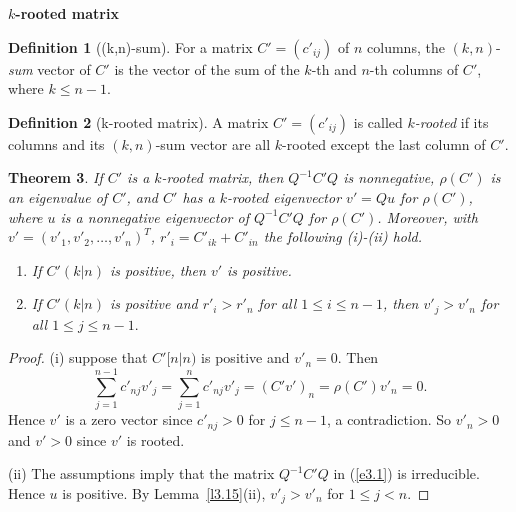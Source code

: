 \documentclass{beamer}
\theoremstyle{plain}
\newtheorem{thm}{Theorem}[section]
\theoremstyle{definition}
\newtheorem{defn}[thm]{Definition}
\begin{document}
\begin{frame}{\bf $k$-rooted matrix}

\begin{defn}[(k,n)-sum]
For a matrix $C'=(c'_{ij})$ of $n$ columns, the $(k, n)$-{\it sum} vector of $C'$ is the vector of the sum of the $k$-th and  $n$-th columns of $C'$, where $k\leq n-1$.
\end{defn}

\begin{defn}[k-rooted matrix]
A  matrix $C'=(c'_{ij})$ is called {\it $k$-rooted}  if its  columns and its $(k, n)$-sum vector are all $k$-rooted except the last column of $C'$.
\end{defn}

\end{frame}

\begin{frame}

\begin{thm}
If $C'$ is a $k$-rooted matrix, then $Q^{-1}C'Q$ is nonnegative, $\rho(C')$ is an eigenvalue of $C'$,
and $C'$ has a $k$-rooted eigenvector $v'=Qu$ for $\rho(C')$,
where $u$ is a nonnegative eigenvector of $Q^{-1}C'Q$ for $\rho(C')$.
    Moreover, with $v'=(v'_1, v'_2, \ldots, v'_n)^T$, $r'_{i} = C'_{ik} + C'_{in}$
    the following (i)-(ii) hold.
\begin{enumerate}
    \item[(i)] If $C' (k|n)$ is positive, then $v'$ is positive.
    \item[(ii)] If  $C' (k|n)$ is positive and  $r'_i> r'_n$ for all $1\leq i\leq n-1$, then $v'_j>v'_n$ for all $1\leq j\leq n-1.$
\end{enumerate}

\end{thm}

\end{frame}

\begin{frame}

\begin{proof}
(i) suppose that $C' [n|n)$ is positive and $v'_n=0$. Then
$$\sum_{j=1}^{n-1}c'_{nj}v'_j=\sum_{j=1}^nc'_{nj}v'_j=(C'v')_n=\rho(C')v'_n=0.$$
Hence $v'$ is a zero vector since $c'_{nj}>0$ for $j\leq n-1$, a contradiction. So $v'_n>0$ and $v'>0$ since $v'$ is rooted.


(ii) The assumptions imply that the matrix $Q^{-1}C'Q$ in (\ref{e3.1}) is irreducible.
Hence $u$ is positive. By Lemma~\ref{l3.15}(ii), $v'_j>v'_n$ for $1\leq j<n.$
\end{proof}

\end{frame}
\end{document}
